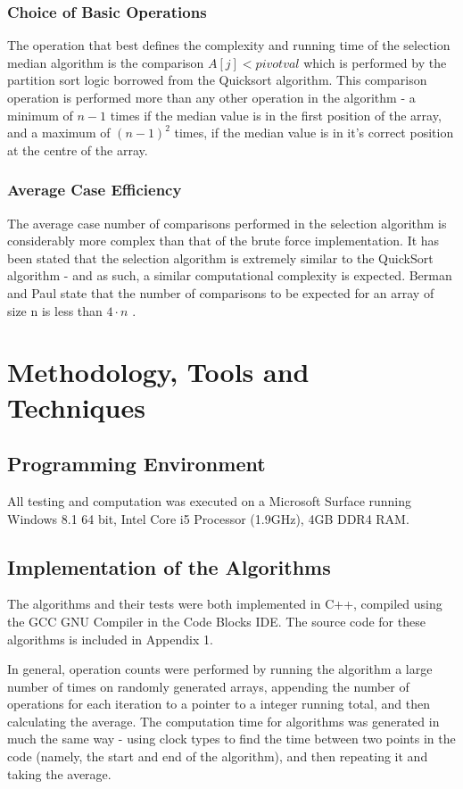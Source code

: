 \documentclass{article}
\begin{document}
        \subsubsection{Choice of Basic Operations}
            The operation that best defines the complexity and running time of the selection median algorithm is the comparison $A[j] < pivotval$ which is performed by the partition sort logic borrowed from the Quicksort algorithm. This comparison operation is performed more than any other operation in the algorithm - a minimum of $n - 1$ times if the median value is in the first position of the array, and a maximum of $(n - 1)^2$ times, if the median value is in it's correct position at the centre of the array.

        \subsubsection{Average Case Efficiency}
            The average case number of comparisons performed in the selection algorithm is considerably more complex than that of the brute force implementation. It has been stated that the selection algorithm is extremely similar to the QuickSort algorithm - and as such, a similar computational complexity is expected. Berman and Paul state that the number of comparisons to be expected for an array of size n is less than $4\cdot n$ \cite{kenneth2004}.

\section{Methodology, Tools and Techniques}
    \subsection{Programming Environment}
        All testing and computation was executed on a Microsoft Surface running Windows 8.1 64 bit, Intel Core i5 Processor (1.9GHz), 4GB DDR4 RAM.
        \subsection{Implementation of the Algorithms}
        The algorithms and their tests were both implemented in C++, compiled using the GCC GNU Compiler in the Code Blocks IDE. The source code for these algorithms is included in Appendix 1.

        In general, operation counts were performed by running the algorithm a large number of times on randomly generated arrays, appending the number of operations for each iteration to a pointer to a integer running total, and then calculating the average. The computation time for algorithms was generated in much the same way - using clock types to find the time between two points in the code (namely, the start and end of the algorithm), and then repeating it and taking the average.
\end{document}

